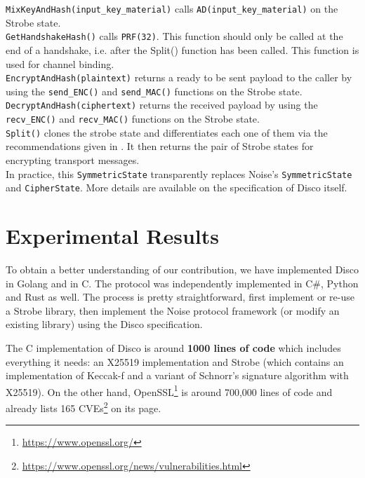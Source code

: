 \documentclass{article}
\begin{document}
\texttt{MixKeyAndHash(input_key_material)} calls \texttt{AD(input_key_material)} on the Strobe state.\\

\texttt{GetHandshakeHash()} calls \texttt{PRF(32)}. This function should only be called at the end of a handshake, i.e. after the Split() function has been called. This function is used for channel binding\cite[Section 11.2]{noise}.\\

\texttt{EncryptAndHash(plaintext)} returns a ready to be sent payload to the caller by using the \texttt{send_ENC()} and \texttt{send_MAC()} functions on the Strobe state.\\

\texttt{DecryptAndHash(ciphertext)} returns the received payload by using the \texttt{recv_ENC()} and \texttt{recv_MAC()} functions on the Strobe state.\\

\texttt{Split()} clones the strobe state and differentiates each one of them via the recommendations given in \cite[Appendix C.1.]{strobe}. It then returns the pair of Strobe states for encrypting transport messages.\\

In practice, this \texttt{SymmetricState} transparently replaces Noise's \texttt{SymmetricState} and \texttt{CipherState}. More details are available on the specification of Disco itself\cite{disco}.

\section{Experimental Results}

To obtain a better understanding of our contribution, we have implemented Disco in Golang\cite{libdisco} and in C\cite{disco-c}. The protocol was independently implemented in C\#\cite{discoNet}, Python\cite{PyDisco} and Rust as well. The process is pretty straightforward, first implement or re-use a Strobe library, then implement the Noise protocol framework (or modify an existing library) using the Disco specification.

The C implementation of Disco is around \textbf{1000 lines of code} which includes everything it needs: an X25519 implementation and Strobe (which contains an implementation of Keccak-f and a variant of Schnorr's signature algorithm with X25519). On the other hand, OpenSSL\footnote{\url{https://www.openssl.org/}} is around 700,000 lines of code and already lists 165 CVEs\footnote{\url{https://www.openssl.org/news/vulnerabilities.html}} on its page.
\end{document}
